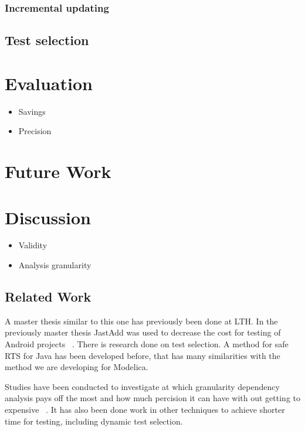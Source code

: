 \documentclass{cslthse-msc}
\begin{document}
\subsection{Incremental updating}

\section{Test selection}

\chapter[Evaluation]{Evaluation}
\begin{itemize}
	\item Savings
	\item Precision
\end{itemize}

\chapter[Future Work]{Future Work}
	
\chapter[Discussion]{Discussion}


\begin{itemize}
	\item Validity
	\item Analysis granularity
\end{itemize}

\section{Related Work}
A master thesis similar to this one has previously been done at LTH. In the previously master thesis JastAdd was used to decrease the cost for testing of Android projects ~\cite{kampe2012dependroid}. There is research done on test selection. A method for safe RTS for Java has been developed before, that has many similarities with the method we are developing for Modelica. 

Studies have been conducted to investigate at which granularity dependency analysis pays off the most and how much percision it can have with out getting to expensive ~\cite{DBLP:conf/sigsoft/LegunsenHSLZM16}. It has also been done work in other techniques to achieve shorter time for testing, including dynamic test selection.
\end{document}
